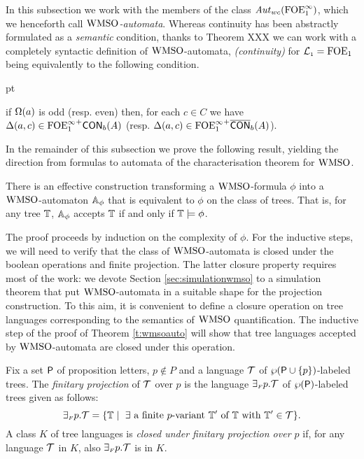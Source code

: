 

In this subsection we work with the members of the class $\mathit{Aut}_{wc}(\mathrm{FOE}^{\infty}_1)$, which we henceforth call \emph{$\mathrm{WMSO}$-automata}. Whereas continuity has been abstractly formulated as a \emph{semantic} condition, thanks to Theorem XXX  we can work with a completely syntactic definition of $\mathrm{WMSO}$-automata, \emph{(continuity)} for $\mathcal{L}_{\scriptscriptstyle 1} = \mathrm{FOE}_1$ being equivalently to the following condition. 
\begin{description}
	 pt
	\item[(continuity, syntactically)] if $\Omega(a)$ is odd (resp. even) then, for each $c\in C$ we have
	   $\Delta(a,c) \in {\ensuremath{\mathrm{FOE}^{\infty}_1}}^+\mathsf{CON}_{b}(A)$ (resp. $\Delta(a,c) \in {\ensuremath{\mathrm{FOE}^{\infty}_1}}^+\overline{\mathsf{CON}}_{b}(A)$).
\end{description} 

In the remainder of this subsection we prove the following result, yielding the direction from formulas to automata of the characterisation theorem for $\mathrm{WMSO}$.

\begin{theorem}
\label{t:wmsoauto}
There is an effective construction transforming a $\mathrm{WMSO}$-formula $\phi$
into a $\mathrm{WMSO}$-automaton $\mathbb{A}_{\phi}$ that is equivalent
to $\phi$ on the class of trees.
That is, for any tree $\mathbb{T}$, $\mathbb{A}_{\phi}$ accepts $\mathbb{T}$ if and only if $\mathbb{T} \models {\phi}$.
\end{theorem}

The proof proceeds by induction on the complexity of
$\phi$. For the inductive steps, we will need to verify that the class of
$\mathrm{WMSO}$-automata is closed under the boolean operations and finite projection.
The latter closure property requires most of the work: we devote Section \ref{sec:simulationwmso} to a simulation theorem that put $\mathrm{WMSO}$-automata in a suitable shape
for the projection construction.
%
To this aim, it is convenient to define a closure operation on tree languages corresponding
to the semantics of $\mathrm{WMSO}$ quantification. The inductive step of the proof of Theorem \ref{t:wmsoauto} will show that tree languages accepted by $\mathrm{WMSO}$-automata are closed under this operation.

\begin{definition}\label{def:tree_finproj}
Fix a set $\mathsf{P}$ of proposition letters, $p \not\in P$ and a language $\mathcal{T}$ of $\wp (\mathsf{P}\cup\{p\})$-labeled
trees.
The \emph{finitary projection} of $\mathcal{T}$ over $p$ is the language
${\exists_{{\scriptscriptstyle F}}} p.\mathcal{T}$ of $\wp (\mathsf{P})$-labeled trees
given as follows:
%
$$
{\finexists} p.\trees = \{\bbT \mid \text{ $\exists$ a finite $p$-variant } \bbT' \text{ of } \bbT \text{ with } \bbT' \in \trees\}.
$$
%
A class $K$ of tree languages is \emph{closed under finitary projection
over $p$} if, for any language $\mathcal{T}$ in $K$, also ${{\exists_{{\scriptscriptstyle F}}} p}.\mathcal{T}$ is in $K$.
\end{definition} 



